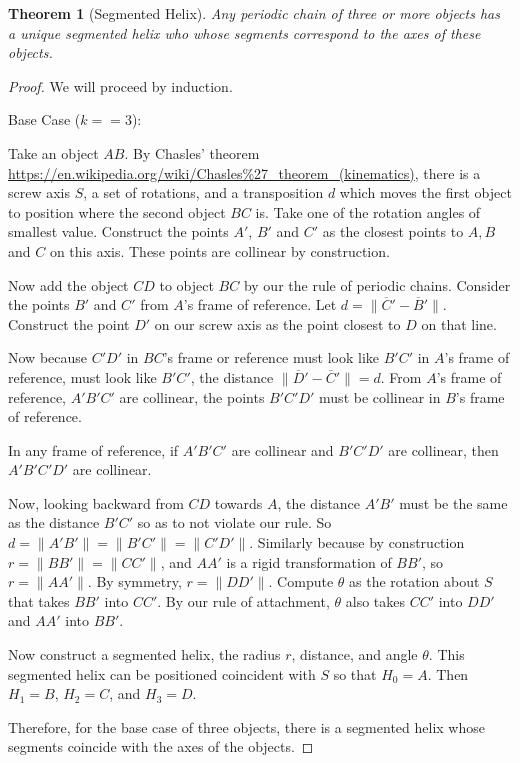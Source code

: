 \documentclass[11pt]{article}
\newtheorem{theorem}{Theorem}
\begin{document}
{\begin{theorem}[Segmented Helix]
  Any periodic chain of three or more objects has a unique segmented helix who
  whose segments correspond
  to the axes of these objects.
\end{theorem}

\begin{proof}
  We will proceed by induction.

  Base Case ($k == 3$):

  Take an object $AB$. By Chasles' theorem  \url{https://en.wikipedia.org/wiki/Chasles%27_theorem_(kinematics)},
    there is a screw axis $S$, a set of rotations,  and a transposition $d$ which moves the first object to
    position where the second object $BC$ is. Take one of the rotation angles of smallest value.
    Construct the points $A'$, $B'$ and $C'$ as the closest points
  to $A,B$ and $C$ on this axis. These points are collinear by construction.

  Now add the object $CD$ to object $BC$ by our the rule of periodic chains. Consider the points
  $B'$ and $C'$ from $A$'s frame of reference. Let $d = \| \overline C' - \overline B' \|$.
  Construct the point $D'$ on our screw axis as the point closest to $D$ on that line.

  Now because $C'D'$ in $BC$'s frame or reference must look like $B'C'$ in $A$'s frame of reference,
  must look like $B'C'$, the distance $\| \overline D' - \overline C' \| = d$.
  From $A$'s frame of reference, $A'B'C'$ are collinear, the points $B'C'D'$ must be collinear in
  $B$'s frame of reference.

  In any frame of reference, if $A'B'C'$ are collinear and $B'C'D'$ are collinear, then $A'B'C'D'$
  are collinear.

  Now, looking backward from $CD$ towards $A$, the distance $A'B'$ must be the same as the
  distance $B'C'$ so as to not violate our rule. So $d = \| A'B' \| = \| B'C' \| = \| C'D'\|$.
  Similarly because by construction $r = \| B B' \| = \| C C' \|$, and $AA'$ is a rigid
  transformation of $BB'$, so $r = \| A A' \|$. By symmetry, $r = \| D D' \|$.
  Compute $\theta$ as the rotation about $S$ that takes $B B'$ into $C C'$. By our rule
  of attachment, $\theta$ also takes $C C'$ into $D D'$ and $A A'$ into $B B'$.

  Now construct a segmented helix, the radius $r$, distance,
  and angle $\theta$. This segmented helix can be positioned coincident with $S$ so
  that $H_0 = A$. Then $H_1=B$, $H_2=C$, and $H_3=D$.

  Therefore, for the base case of three objects, there is a segmented helix whose
  segments coincide with the axes of the objects.



\end{proof}}
\end{document}
